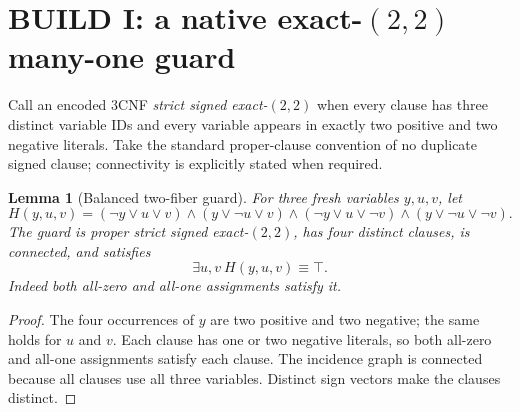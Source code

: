 \documentclass[11pt]{article}
\newtheorem{lemma}[theorem]{Lemma}
\begin{document}
\section{BUILD I: a native exact-$(2,2)$ many-one guard}
Call an encoded 3CNF \emph{strict signed exact-$(2,2)$} when every clause has three distinct variable IDs and every variable appears in exactly two positive and two negative literals. Take the standard proper-clause convention of no duplicate signed clause; connectivity is explicitly stated when required.

\begin{lemma}[Balanced two-fiber guard]\label{guard}
For three fresh variables $y,u,v$, let
\begin{equation}\label{eq:guard}
H(y,u,v)=
(\neg y\vee u\vee v)\wedge(y\vee\neg u\vee v)\wedge
(\neg y\vee u\vee\neg v)\wedge(y\vee\neg u\vee\neg v).
\end{equation}
The guard is proper strict signed exact-$(2,2)$, has four distinct clauses, is connected, and satisfies
\[\exists u,v\ H(y,u,v)\equiv\top.\]
Indeed both all-zero and all-one assignments satisfy it.
\end{lemma}
\begin{proof}
The four occurrences of $y$ are two positive and two negative; the same holds for $u$ and $v$. Each clause has one or two negative literals, so both all-zero and all-one assignments satisfy each clause. The incidence graph is connected because all clauses use all three variables. Distinct sign vectors make the clauses distinct.
\end{proof}
\end{document}
